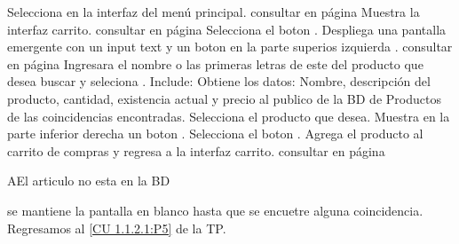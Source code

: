 
\begin{UCtrayectoria}
		
	\UCpaso [\UCactor]Selecciona  en la interfaz del menú principal. consultar en página \pageref{UI: menu principal}
	\UCpaso [\UCsist]Muestra la interfaz carrito. consultar en página \pageref{UI: carrito}
	\UCpaso [\UCactor]Selecciona el boton .
	\UCpaso [\UCsist]Despliega una pantalla emergente con un input text y un boton  en la parte superios izquierda . consultar en página \pageref{UI: carrito buscar}
	\UCpaso [\UCactor]Ingresara el nombre o las primeras letras de este del producto que desea buscar y seleciona .   \label{CU 1.1.2.1:P5}	
	\UCpaso [\UCsist] Include: Obtiene los datos: Nombre, descripción del producto, cantidad, existencia actual y precio al publico de la BD de Productos de las coincidencias encontradas.
	\UCpaso [\UCactor]Selecciona el producto que desea.
	\UCpaso [\UCsist]Muestra en la parte inferior derecha un boton .
	\UCpaso [\UCactor]Selecciona el boton .
	\UCpaso [\UCsist]Agrega el producto al carrito de compras y regresa a la interfaz carrito. consultar en página \pageref{UI: carrito}

	
\end{UCtrayectoria}



\begin{UCtrayectoriaA}{A}{El articulo no esta en la BD}

	\UCpaso [\UCsist] se mantiene la pantalla en blanco hasta que se encuetre alguna coincidencia.
	\UCpaso [\UCsist]Regresamos al \ref{CU 1.1.2.1:P5} de la TP.
\end{UCtrayectoriaA}










